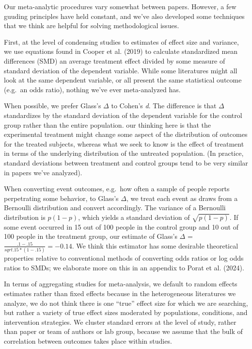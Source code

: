 \documentclass[
  man]{apa6}
\begin{document}
Our meta-analytic procedures vary somewhat between papers. However, a few guuding principles have held constant, and we've also developed some techniques that we think are helpful for solving methodological issues.

First, at the level of condensing studies to estimates of effect size and variance, we use equations found in Cooper et al. (2019) to calculate standardized mean differences (SMD) \textemdash an average treatment effect divided by some measure of standard deviation of the dependent variable. While some literatures might all look at the same dependent variable, or all present the same statistical outcome (e.g.~an odds ratio), nothing we've ever meta-analyzed has.

When possible, we prefer Glass's \(\Delta\) to Cohen's \emph{d}. The difference is that \(\Delta\) standardizes by the standard deviation of the dependent variable for the control group rather than the entire population. our thinking here is that the experimental treatment might change some aspect of the distribution of outcomes for the treated subjects, whereas what we seek to know is the effect of treatment in terms of the underlying distribution of the untreated population. (In practice, standard deviations between treatment and control groups tend to be very similar in papers we've analyzed).

When converting event outcomes, e.g.~how often a sample of people reports perpetrating some behavior, to Glass's \(\Delta\), we treat each event as draws from a Bernoulli distribution and convert accordingly. The variance of a Bernoulli distribution is \(p (1-p)\), which yields a standard deviation of \(\sqrt{p (1-p)}\). If some event occurred in 15 out of 100 people in the control group and 10 out of 100 people in the treatment group, our estimate of Glass's \(\Delta\) = \(\frac{.1 - .15}{sqrt{.15 * (1 - .15)}} = -0.14\). We think this estimator has some desirable theoretical properties relative to conventional methods of converting odds ratios or log odds ratios to SMDs; we elaborate more on this in an appendix to Porat et al. (2024).

In terms of aggregating studies for meta-analysis, we default to random effects estimates rather than fixed effects because in the heterogeneous literatures we analyze, we do not think there is one ``true'' effect size for which we are searching, but rather a variety of true effect sizes moderated by populations, conditions, and intervention strategies. We cluster standard errors at the level of study, rather than paper or team of authors or lab group, because we assume that the bulk of correlation between outcomes takes place within studies.
\end{document}
